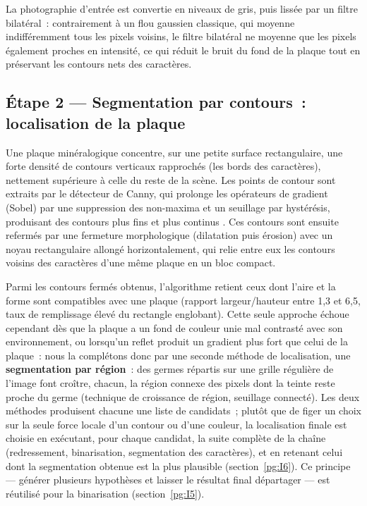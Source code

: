 \documentclass[11pt,a4paper]{article}
\begin{document}
La photographie d'entrée est convertie en niveaux de gris, puis lissée par un filtre bilatéral~: contrairement à un flou gaussien classique, qui moyenne indifféremment tous les pixels voisins, le filtre bilatéral ne moyenne que les pixels également proches en intensité, ce qui réduit le bruit du fond de la plaque tout en préservant les contours nets des caractères.

\subsection{Étape 2 --- Segmentation par contours~: localisation de la plaque}
\label{pg:I4}

Une plaque minéralogique concentre, sur une petite surface rectangulaire, une forte densité de contours verticaux rapprochés (les bords des caractères), nettement supérieure à celle du reste de la scène. Les points de contour sont extraits par le détecteur de Canny, qui prolonge les opérateurs de gradient (Sobel) par une suppression des non-maxima et un seuillage par hystérésis, produisant des contours plus fins et plus continus \cite{ref_canny}. Ces contours sont ensuite refermés par une fermeture morphologique (dilatation puis érosion) avec un noyau rectangulaire allongé horizontalement, qui relie entre eux les contours voisins des caractères d'une même plaque en un bloc compact.

Parmi les contours fermés obtenus, l'algorithme retient ceux dont l'aire et la forme sont compatibles avec une plaque (rapport largeur/hauteur entre 1,3 et 6,5, taux de remplissage élevé du rectangle englobant). Cette seule approche échoue cependant dès que la plaque a un fond de couleur unie mal contrasté avec son environnement, ou lorsqu'un reflet produit un gradient plus fort que celui de la plaque~: nous la complétons donc par une seconde méthode de localisation, une \textbf{segmentation par région}~: des germes répartis sur une grille régulière de l'image font croître, chacun, la région connexe des pixels dont la teinte reste proche du germe (technique de croissance de région, seuillage connecté). Les deux méthodes produisent chacune une liste de candidats~; plutôt que de figer un choix sur la seule force locale d'un contour ou d'une couleur, la localisation finale est choisie en exécutant, pour chaque candidat, la suite complète de la chaîne (redressement, binarisation, segmentation des caractères), et en retenant celui dont la segmentation obtenue est la plus plausible (section~\ref{pg:I6}). Ce principe --- générer plusieurs hypothèses et laisser le résultat final départager --- est réutilisé pour la binarisation (section~\ref{pg:I5}).
\end{document}
